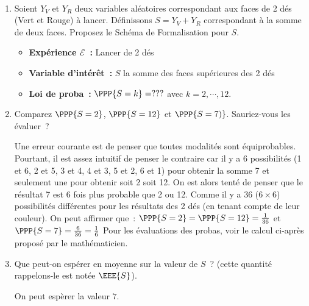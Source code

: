 \documentclass[10pt]{report}
\begin{document}
\begin{exercice}\label{ex:sommeDes} ${ }$\label{ex:sommeDes}


\begin{enumerate}
\item Soient $Y_V$ et $Y_R$ deux variables aléatoires correspondant aux faces de 2 dés (Vert et Rouge) à lancer. Définissons $S=Y_V+Y_R$ correspondant à la somme de deux faces.
Proposez le Schéma de Formalisation pour $S$. \\
\begin{Correction}
\begin{itemize}
\item \textbf{Expérience $\mathcal{E}$~:} Lancer de 2 dés
\item \textbf{Variable d'intérêt~:} $S$ la somme des faces supérieures des 2 dés
\item \textbf{Loi de proba~:} $\PPP{S=k}=???$ avec $k=2,\cdots,12$.
\end{itemize}
\end{Correction}

\item Comparez $\PPP{S=2}$, $\PPP{S=12}$ et $\PPP{S=7)}$. Sauriez-vous les évaluer~?

\begin{Correction}Une erreur courante est de penser que toutes modalités sont équiprobables. Pourtant, il est assez intuitif de penser le contraire car il y a 6 possibilités (1 et 6, 2 et 5, 3 et 4, 4 et 3, 5 et 2, 6 et 1) pour obtenir la somme 7 et seulement une pour obtenir soit 2 soit 12. On est alors tenté de penser que le résultat 7 est 6 fois plus probable que 2 ou 12. Comme il y a 36 ($6\times6$) possibilités différentes pour les résultats des 2 dés (en tenant compte de leur couleur). On peut affirmer que~: $\PPP{S=2}=\PPP{S=12}=\frac1{36}$ et $\PPP{S=7}=\frac6{36}=\frac16$ 
Pour les évaluations des probas, voir le calcul ci-après proposé par le mathématicien.
\end{Correction}

\item Que peut-on espérer en moyenne sur la valeur de $S$~? (cette quantité rappelons-le est notée $\EEE{S}$).

\begin{Correction}
On peut espèrer la valeur $7$.
\end{Correction}



\end{enumerate}
\end{exercice}
\end{document}
